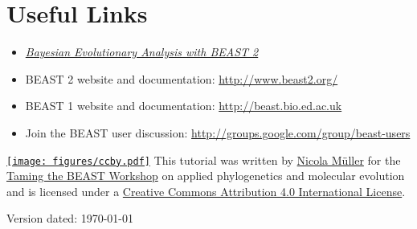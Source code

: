 \documentclass[11pt]{article}
\begin{document}
\bigskip
\section{Useful Links}

\begin{itemize}
\item \href{http://www.beast2.org/book.html}{\textit{Bayesian Evolutionary Analysis with BEAST 2}}  \citep{BEAST2book2014}\\ \vspace{-7mm}
\item BEAST 2 website and documentation: \href{http://www.beast2.org/}{http://www.beast2.org/} \\ \vspace{-7mm}
\item BEAST 1 website and documentation: \href{http://beast.bio.ed.ac.uk}{http://beast.bio.ed.ac.uk} \\ \vspace{-7mm}
\item Join the BEAST user discussion: \href{http://groups.google.com/group/beast-users}{http://groups.google.com/group/beast-users} \\ \vspace{-7mm}
\end{itemize}


\href{http://creativecommons.org/licenses/by/4.0/}{\texttt{[image: figures/ccby.pdf]}} This tutorial was written by \href{https://www.bsse.ethz.ch/cevo/the-group/people/person-detail.html?persid=181412}{Nicola M\"{u}ller} for the \href{https://www.bsse.ethz.ch/cevo/taming-the-beast.html}{Taming the BEAST Workshop} on applied phylogenetics and molecular evolution and is licensed under a \href{http://creativecommons.org/licenses/by/4.0/}{Creative Commons Attribution 4.0 International License}. 



Version dated: \today



\newpage


\printbibliography[heading=relevref]
\end{document}
